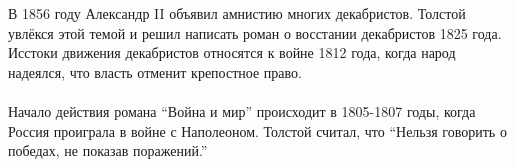 \documentclass{article}
\begin{document}
В 1856 году Александр II объявил амнистию многих декабристов.
Толстой увлёкся этой темой и решил написать роман о восстании декабристов 1825 года. Исстоки движения декабристов
относятся к войне 1812 года, когда народ надеялся, что власть отменит крепостное право. 

\paragraph{}

Начало действия романа ``Война и мир'' происходит в 1805-1807 годы, когда Россия проиграла в войне с Наполеоном.
Толстой считал, что ``Нельзя говорить о победах, не показав поражений.''

\paragraph{}
\noindent{}
\paragraph{}
\noindent{}
\paragraph{}
\noindent{}
\end{document}

